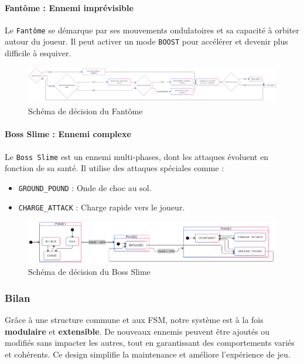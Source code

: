 \documentclass[a4paper,11pt]{article}
\begin{document}
\paragraph{Fantôme : Ennemi imprévisible}  
Le \texttt{Fantôme} se démarque par ses mouvements ondulatoires et sa capacité à orbiter autour du joueur. Il peut activer un mode \texttt{BOOST} pour accélérer et devenir plus difficile à esquiver.

\begin{figure}[h]
    \centering
    \includegraphics[width=1.12\linewidth]{img/ghostFSM.png}
    \caption{Schéma de décision du Fantôme}
    \label{fig:ghost_fsm}
\end{figure}

\paragraph{Boss Slime : Ennemi complexe}  
Le \texttt{Boss Slime} est un ennemi multi-phases, dont les attaques évoluent en fonction de sa santé. Il utilise des attaques spéciales comme :
\begin{itemize}
    \item \texttt{GROUND\_POUND} : Onde de choc au sol.
    \item \texttt{CHARGE\_ATTACK} : Charge rapide vers le joueur.
\end{itemize}

\begin{figure}[h]
    \centering
    \includegraphics[width=0.75\linewidth]{img/bossFSM.png}
    \caption{Schéma de décision du Boss Slime}
    \label{fig:boss_fsm}
\end{figure}

\subsubsection{Bilan}
\label{sec:bilan_ennemis}

Grâce à une structure commune et aux FSM, notre système est à la fois \textbf{modulaire} et \textbf{extensible}. De nouveaux ennemis peuvent être ajoutés ou modifiés sans impacter les autres, tout en garantissant des comportements variés et cohérents. Ce design simplifie la maintenance et améliore l’expérience de jeu.
\end{document}
